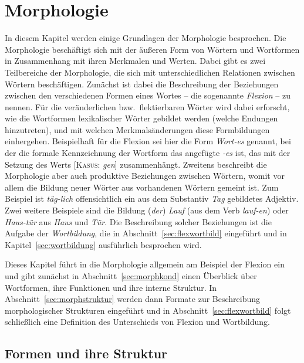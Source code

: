 \chapter{Morphologie}


\label{sec:morphologie}

In diesem Kapitel werden einige Grundlagen der Morphologie besprochen.
Die Morphologie beschäftigt sich mit der äußeren Form von Wörtern und Wortformen in Zusammenhang mit ihren Merkmalen und Werten.
Dabei gibt es zwei Teilbereiche der Morphologie, die sich mit unterschiedlichen Relationen zwischen Wörtern beschäftigen.
Zunächst ist dabei die Beschreibung der Beziehungen zwischen den verschiedenen Formen eines Wortes -- die sogenannte \textit{Flexion} -- zu nennen.
Für die veränderlichen bzw.\ flektierbaren Wörter wird dabei erforscht, wie die Wortformen lexikalischer Wörter gebildet werden (\zB welche Endungen hinzutreten), und mit welchen Merkmalsänderungen diese Formbildungen einhergehen.
Beispielhaft für die Flexion sei hier die Form \textit{Wort-es} genannt, bei der die formale Kennzeichnung der Wortform das angefügte \textit{-es} ist, das mit der Setzung des Werts [\textsc{Kasus}: \textit{gen}] zusammenhängt.
Zweitens beschreibt die Morphologie aber auch produktive Beziehungen zwischen Wörtern, womit vor allem die Bildung neuer Wörter aus vorhandenen Wörtern gemeint ist.
Zum Beispiel ist \textit{täg-lich} offensichtlich ein aus dem Substantiv \textit{Tag} gebildetes Adjektiv.
Zwei weitere Beispiele sind die Bildung (\textit{der}) \textit{Lauf} (aus dem Verb \textit{lauf-en}) oder \textit{Haus-tür} aus \textit{Haus} und \textit{Tür}.
Die Beschreibung solcher Beziehungen ist die Aufgabe der \textit{Wortbildung}, die in Abschnitt~\ref{sec:flexwortbild} eingeführt und in Kapitel~\ref{sec:wortbildung} ausführlich besprochen wird.

Dieses Kapitel führt in die Morphologie allgemein am Beispiel der Flexion ein und gibt zunächst in Abschnitt~\ref{sec:morphkond} einen Überblick über Wortformen, ihre Funktionen und ihre interne Struktur.
In Abschnitt~\ref{sec:morphstruktur} werden dann Formate zur Beschreibung morphologischer Strukturen eingeführt und in Abschnitt~\ref{sec:flexwortbild} folgt schließlich eine Definition des Unterschieds von Flexion und Wortbildung.

\section{Formen und ihre Struktur}

